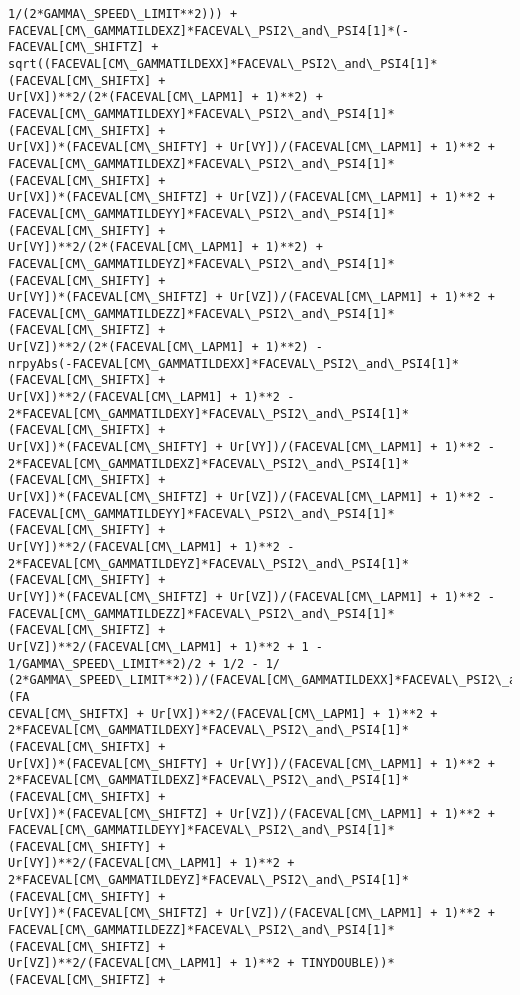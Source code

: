 \documentclass[landscape,letterpaper,10pt,english]{article}
\begin{document}
\begin{Verbatim}[commandchars=\\\{\}]
1/(2*GAMMA\_SPEED\_LIMIT**2))) +
FACEVAL[CM\_GAMMATILDEXZ]*FACEVAL\_PSI2\_and\_PSI4[1]*(-FACEVAL[CM\_SHIFTZ] +
sqrt((FACEVAL[CM\_GAMMATILDEXX]*FACEVAL\_PSI2\_and\_PSI4[1]*(FACEVAL[CM\_SHIFTX] +
Ur[VX])**2/(2*(FACEVAL[CM\_LAPM1] + 1)**2) +
FACEVAL[CM\_GAMMATILDEXY]*FACEVAL\_PSI2\_and\_PSI4[1]*(FACEVAL[CM\_SHIFTX] +
Ur[VX])*(FACEVAL[CM\_SHIFTY] + Ur[VY])/(FACEVAL[CM\_LAPM1] + 1)**2 +
FACEVAL[CM\_GAMMATILDEXZ]*FACEVAL\_PSI2\_and\_PSI4[1]*(FACEVAL[CM\_SHIFTX] +
Ur[VX])*(FACEVAL[CM\_SHIFTZ] + Ur[VZ])/(FACEVAL[CM\_LAPM1] + 1)**2 +
FACEVAL[CM\_GAMMATILDEYY]*FACEVAL\_PSI2\_and\_PSI4[1]*(FACEVAL[CM\_SHIFTY] +
Ur[VY])**2/(2*(FACEVAL[CM\_LAPM1] + 1)**2) +
FACEVAL[CM\_GAMMATILDEYZ]*FACEVAL\_PSI2\_and\_PSI4[1]*(FACEVAL[CM\_SHIFTY] +
Ur[VY])*(FACEVAL[CM\_SHIFTZ] + Ur[VZ])/(FACEVAL[CM\_LAPM1] + 1)**2 +
FACEVAL[CM\_GAMMATILDEZZ]*FACEVAL\_PSI2\_and\_PSI4[1]*(FACEVAL[CM\_SHIFTZ] +
Ur[VZ])**2/(2*(FACEVAL[CM\_LAPM1] + 1)**2) -
nrpyAbs(-FACEVAL[CM\_GAMMATILDEXX]*FACEVAL\_PSI2\_and\_PSI4[1]*(FACEVAL[CM\_SHIFTX] +
Ur[VX])**2/(FACEVAL[CM\_LAPM1] + 1)**2 -
2*FACEVAL[CM\_GAMMATILDEXY]*FACEVAL\_PSI2\_and\_PSI4[1]*(FACEVAL[CM\_SHIFTX] +
Ur[VX])*(FACEVAL[CM\_SHIFTY] + Ur[VY])/(FACEVAL[CM\_LAPM1] + 1)**2 -
2*FACEVAL[CM\_GAMMATILDEXZ]*FACEVAL\_PSI2\_and\_PSI4[1]*(FACEVAL[CM\_SHIFTX] +
Ur[VX])*(FACEVAL[CM\_SHIFTZ] + Ur[VZ])/(FACEVAL[CM\_LAPM1] + 1)**2 -
FACEVAL[CM\_GAMMATILDEYY]*FACEVAL\_PSI2\_and\_PSI4[1]*(FACEVAL[CM\_SHIFTY] +
Ur[VY])**2/(FACEVAL[CM\_LAPM1] + 1)**2 -
2*FACEVAL[CM\_GAMMATILDEYZ]*FACEVAL\_PSI2\_and\_PSI4[1]*(FACEVAL[CM\_SHIFTY] +
Ur[VY])*(FACEVAL[CM\_SHIFTZ] + Ur[VZ])/(FACEVAL[CM\_LAPM1] + 1)**2 -
FACEVAL[CM\_GAMMATILDEZZ]*FACEVAL\_PSI2\_and\_PSI4[1]*(FACEVAL[CM\_SHIFTZ] +
Ur[VZ])**2/(FACEVAL[CM\_LAPM1] + 1)**2 + 1 - 1/GAMMA\_SPEED\_LIMIT**2)/2 + 1/2 - 1/
(2*GAMMA\_SPEED\_LIMIT**2))/(FACEVAL[CM\_GAMMATILDEXX]*FACEVAL\_PSI2\_and\_PSI4[1]*(FA
CEVAL[CM\_SHIFTX] + Ur[VX])**2/(FACEVAL[CM\_LAPM1] + 1)**2 +
2*FACEVAL[CM\_GAMMATILDEXY]*FACEVAL\_PSI2\_and\_PSI4[1]*(FACEVAL[CM\_SHIFTX] +
Ur[VX])*(FACEVAL[CM\_SHIFTY] + Ur[VY])/(FACEVAL[CM\_LAPM1] + 1)**2 +
2*FACEVAL[CM\_GAMMATILDEXZ]*FACEVAL\_PSI2\_and\_PSI4[1]*(FACEVAL[CM\_SHIFTX] +
Ur[VX])*(FACEVAL[CM\_SHIFTZ] + Ur[VZ])/(FACEVAL[CM\_LAPM1] + 1)**2 +
FACEVAL[CM\_GAMMATILDEYY]*FACEVAL\_PSI2\_and\_PSI4[1]*(FACEVAL[CM\_SHIFTY] +
Ur[VY])**2/(FACEVAL[CM\_LAPM1] + 1)**2 +
2*FACEVAL[CM\_GAMMATILDEYZ]*FACEVAL\_PSI2\_and\_PSI4[1]*(FACEVAL[CM\_SHIFTY] +
Ur[VY])*(FACEVAL[CM\_SHIFTZ] + Ur[VZ])/(FACEVAL[CM\_LAPM1] + 1)**2 +
FACEVAL[CM\_GAMMATILDEZZ]*FACEVAL\_PSI2\_and\_PSI4[1]*(FACEVAL[CM\_SHIFTZ] +
Ur[VZ])**2/(FACEVAL[CM\_LAPM1] + 1)**2 + TINYDOUBLE))*(FACEVAL[CM\_SHIFTZ] +

\end{Verbatim}
\end{document}
